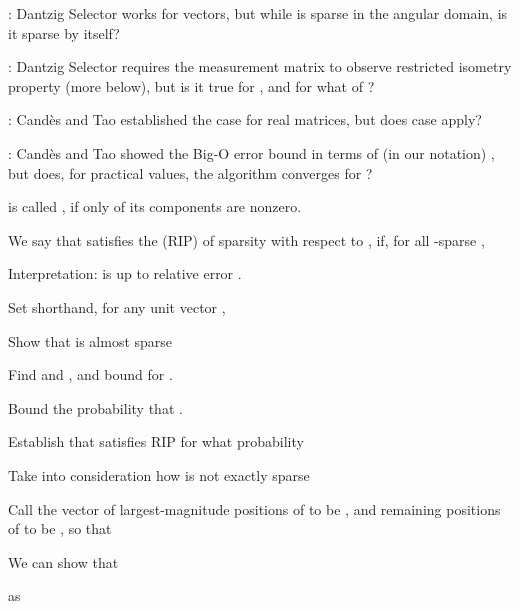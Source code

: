 {
\I {}: Dantzig Selector works for  vectors, but while  is sparse in the angular domain, is it sparse by itself?

\I {}: Dantzig Selector requires the measurement matrix to observe restricted isometry property (more below), but is it true for , and for what  of ?

\I {}: Cand\`es and Tao established the case for real matrices, but does  case apply?

\I {}: Cand\`es and Tao showed the Big-O error bound in terms of (in our notation) , but does, for practical values, the algorithm converges for ?
}
{
\I {} is called , if only  of its components are nonzero.

\I We say that  satisfies the  (RIP) of sparsity  with respect to , if, for all -sparse ,

\I Interpretation:  is  up to relative error .

\I Set shorthand, for any unit vector ,
}
{
\I Show that  is almost sparse

\I Find  and , and bound  for .

\I Bound the probability that .

\I Establish that  satisfies RIP for what probability

\I Take into consideration how  is not exactly sparse
}
{
\I Call the vector of largest-magnitude  positions of  to be , and remaining positions of  to be , so that 

\I We can show that 

\I {} as 
}
